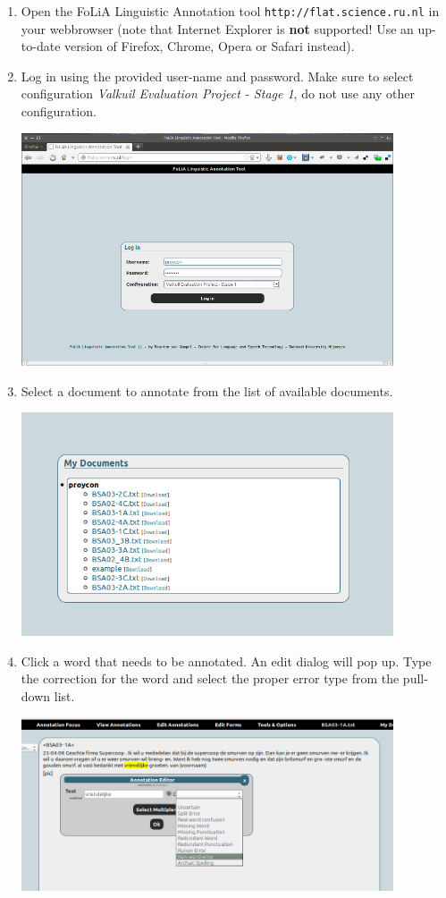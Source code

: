 \documentclass[a4paper,11pt]{article}
\begin{document}
\begin{enumerate}
\item Open the FoLiA Linguistic Annotation tool
  \texttt{http://flat.science.ru.nl} in your webbrowser (note that
  Internet Explorer is \textbf{not} supported! Use an up-to-date version of
  Firefox, Chrome, Opera or Safari instead). 
\item Log in using the provided user-name and password. Make sure to select configuration
  \emph{Valkuil Evaluation Project - Stage 1}, do not use any other
  configuration.
  \begin{center}
    \includegraphics[width=11cm]{login.png}
  \end{center}
\item Select a document to annotate from the list of available documents.
  \begin{center}
    \includegraphics[width=11cm]{mydocuments.png}
  \end{center}
\item Click a word that needs to be annotated. An edit dialog will pop up.
  Type the correction for the word and select the proper error type from the
  pull-down list.
  \begin{center}
    \includegraphics[width=11cm]{edit1.png}

\end{center}
\end{enumerate}
\end{document}
